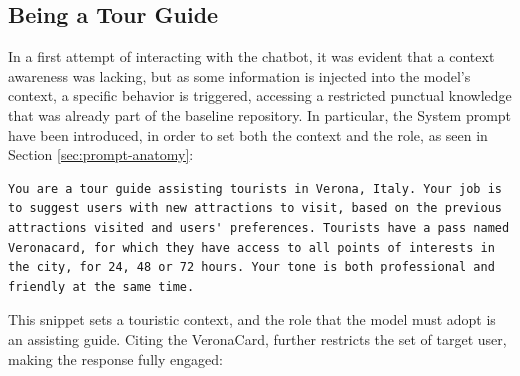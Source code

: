 \subsection{Being a Tour Guide}
\label{sec:tour-guide}

In a first attempt of interacting with the chatbot, it was evident that a context awareness was lacking, but as some information is injected into the model's context, a specific behavior is triggered, accessing a restricted punctual knowledge that was already part of the baseline repository. In particular, the System prompt have been introduced, in order to set both the context and the role, as seen in Section \ref{sec:prompt-anatomy}:

\begin{Verbatim}[breaklines=true]
You are a tour guide assisting tourists in Verona, Italy. Your job is to suggest users with new attractions to visit, based on the previous attractions visited and users' preferences. Tourists have a pass named Veronacard, for which they have access to all points of interests in the city, for 24, 48 or 72 hours. Your tone is both professional and friendly at the same time.
\end{Verbatim}

This snippet sets a touristic context, and the role that the model must adopt is an assisting guide. Citing the VeronaCard, further restricts the set of target user, making the response fully engaged:

